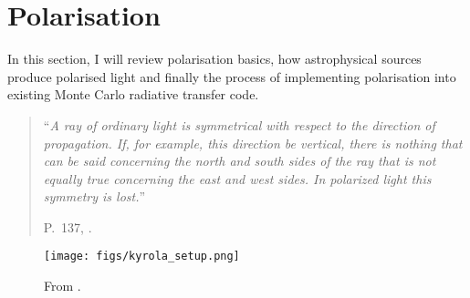 \documentclass[ignorenonframetext]{beamer}
\begin{document}
\section{Polarisation}
In this section, I will review polarisation basics, how astrophysical sources produce polarised light and finally the process of implementing polarisation into existing Monte Carlo radiative transfer code.

\begin{frame}
\pause
\begin{quotation}
    ``\textit{A ray of ordinary light is symmetrical with respect to the direction of propagation. If, for example, this direction be vertical, there is nothing that can be said concerning the north and south sides of the ray that is not equally true concerning the east and west sides. In polarized light this symmetry is lost.}''
    
    \hfill P.~137, \cite{1888Rayleigh}.
\end{quotation}

\end{frame}

\begin{frame}

\begin{figure}[htb]
    \centering
    \texttt{[image: figs/kyrola\_setup.png]}
    \caption{From .}
    \label{fig:kyrola_setup}
\end{figure}


\end{frame}
\end{document}
